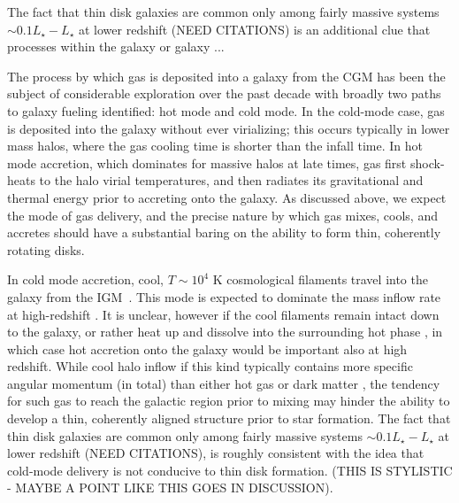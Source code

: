 \documentclass[fleqn,usenatbib]{mnras}
\begin{document}
The fact that thin disk galaxies are common only among fairly massive systems $\sim 0.1 L_\star - L_\star$ at lower redshift (NEED CITATIONS) is an additional clue that processes within the galaxy or galaxy ...
 
The process by which gas is deposited into a galaxy from the CGM has been the subject of considerable exploration over the past decade \citep[e.g.][]{Keres2005, Dekel2006, Keres2009, Martin2019a} with broadly two paths to galaxy fueling identified: hot mode and cold mode.
In the cold-mode case, gas is deposited into the galaxy without ever virializing; this occurs typically in lower mass halos, where the gas cooling time is shorter than the infall time.
In hot mode accretion, which dominates for massive halos at late times, gas first shock-heats to the halo virial temperatures, and then radiates its gravitational and thermal energy prior to accreting onto the galaxy.
As discussed above, we expect the mode of gas delivery, and the precise nature by which gas mixes, cools, and accretes should have a substantial baring on the ability to form thin, coherently rotating disks.  

In cold mode accretion, cool, $T \sim 10^4$ K cosmological filaments travel into the galaxy from the IGM~\cite[e.g.][]{Keres2005, Dekel2006, Keres2009, Martin2019a}. This mode is expected to dominate the mass inflow rate at high-redshift \citep[$z\gtrsim2$, e.g.][]{Keres2009a, Dekel2009, Huscher2020}. It is unclear, however if the cool filaments remain intact down to the galaxy, or rather heat up and dissolve into the surrounding hot phase \citep{Nelson2016, Mandelker+}, in which case hot accretion onto the galaxy would be important also at high redshift. While cool halo inflow if this kind typically contains more specific angular momentum (in total) than either hot gas or dark matter \citep{Stewart2017}, the tendency for such gas to reach the galactic region prior to mixing may hinder the ability to develop a thin, coherently aligned structure prior to star formation. The fact that thin disk galaxies are common only among fairly massive systems $\sim 0.1 L_\star - L_\star$ at lower redshift (NEED CITATIONS), is roughly consistent with the idea that cold-mode delivery is not conducive to thin disk formation. (THIS IS STYLISTIC - MAYBE A POINT LIKE THIS GOES IN DISCUSSION).
\end{document}
